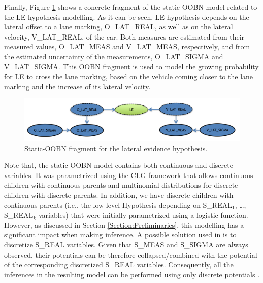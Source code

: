 Finally, Figure \ref{Figure:DaimlerLE} shows a concrete fragment of the static OOBN model related to the LE hypothesis modelling. As it can be seen, LE hypothesis depends on the lateral offset to a lane marking, O\_LAT\_REAL, as well as on the lateral velocity, V\_LAT\_REAL, of the car. Both measures are estimated from their measured values, O\_LAT\_MEAS and V\_LAT\_MEAS, respectively, and from the estimated uncertainty of the measurements, O\_LAT\_SIGMA and V\_LAT\_SIGMA. This OOBN fragment is used to model the growing probability for LE to cross the lane marking, based on the vehicle coming closer to the lane marking and the increase of its lateral velocity.

\begin{figure}[ht!]
\begin{center}
\includegraphics[scale=0.48]{./figures/DaimlerLE}
\caption{\label{Figure:DaimlerLE} Static-OOBN fragment for the lateral evidence hypothesis.}
\end{center}
\end{figure}

Note that, the static OOBN model contains both continuous and discrete variables. It was parametrized using the CLG framework\cite{JensenNielsen2007,lauritzen1996graphical} that allows continuous children with continuous parents and multinomial distributions for discrete children with discrete parents. In addition, we have discrete children with continuous parents (i.e., the low-level Hypothesis depending on S\_REAL$_1$, \ldots, S\_REAL$_k$ variables) that were initially parametrized using a logistic function. However, as discussed in Section \ref{Section:Preliminaries}, this modelling has a significant impact when making inference. A possible solution used in \cite{kasper2012object} is to discretize S\_REAL variables. Given that S\_MEAS and S\_SIGMA are always observed, their potentials can be therefore collapsed/combined with the potential of the corresponding discretized S\_REAL variables. Consequently, all the inferences in the resulting model can be performed using only discrete potentials \cite{JensenNielsen2007}.
